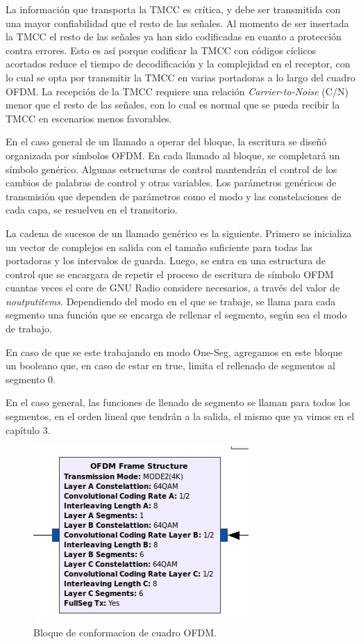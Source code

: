 La información que transporta la TMCC es crítica, y debe ser transmitida con una mayor confiabilidad que el resto de las señales. Al momento de ser insertada la TMCC el resto de las señales ya han sido codificadas en cuanto a protección contra errores. Esto es así porque codificar la TMCC con códigos cíclicos acortados reduce el tiempo de decodificación y la complejidad en el receptor, con lo cual se opta por transmitir la TMCC en varias portadoras a lo largo del cuadro OFDM. La recepción de la TMCC requiere una relación \textit{Carrier-to-Noise} (C/N) menor que el resto de las señales, con lo cual es normal que se pueda recibir la TMCC en escenarios menos favorables.

En el caso general de un llamado a operar del bloque, la escritura se diseñó organizada por símbolos OFDM. En cada llamado al bloque, se completará un símbolo genérico. Algunas estructuras de control mantendrán el control de los cambios de palabras de control y otras variables. Los parámetros genéricos de transmisión que dependen de parámetros como el modo y las constelaciones de cada capa, se resuelven en el transitorio.

La cadena de sucesos de un llamado genérico es la siguiente. Primero se inicializa un vector de complejos en salida con el tamaño suficiente para todas las portadoras y los intervalos de guarda. Luego, se entra en una estructura de control que se encargara de  repetir el proceso de escritura de símbolo OFDM cuantas veces el core de GNU Radio considere necesarios, a través del valor de \textit{noutputitems}. Dependiendo del modo en el que se trabaje, se llama para cada segmento una función que se encarga de rellenar el segmento, según sea el modo de trabajo.

En caso de que se este trabajando en modo One-Seg, agregamos en este bloque un booleano que, en caso de estar en true, limita el rellenado de segmentos al segmento 0. 

En el caso general, las funciones de llenado de segmento se llaman para todos los segmentos, en el orden lineal que tendrán a la salida, el mismo que ya vimos en el capítulo 3.

\begin{figure}[h!]
	\centering
	\includegraphics[scale=0.5]{figuras/cap05/bloque_ofdm}
	\caption{\label{f:bloque_ofdm} Bloque de conformacion de cuadro OFDM.}
\end{figure}

